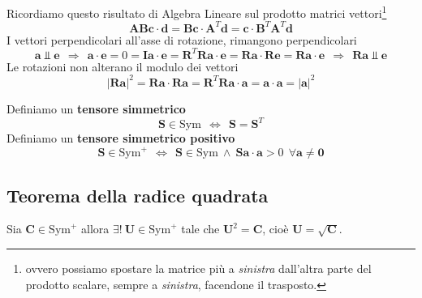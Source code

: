 \documentclass[10pt,a4paper,twoside]{book}
\begin{document}
\begin{oss}
Ricordiamo questo risultato di Algebra Lineare sul prodotto matrici vettori\footnote{ovvero possiamo spostare la matrice più a \textit{sinistra} dall'altra parte del prodotto scalare, sempre a \textit{sinistra}, facendone il trasposto.}
\begin{equation*}
\mathbf{ABc} \cdotp \mathbf{d} =\mathbf{Bc} \cdotp \mathbf{A}^{T}\mathbf{d} =\mathbf{c} \cdotp \mathbf{B}^{T}\mathbf{A}^{T}\mathbf{d}
\end{equation*}
I vettori perpendicolari all'asse di rotazione, rimangono perpendicolari
\begin{equation*}
\mathbf{a} \Bot \mathbf{e} \ \ \Rightarrow \ \ \mathbf{a\cdotp e} =0=\mathbf{Ia} \cdotp \mathbf{e} =\mathbf{R}^{T}\mathbf{Ra} \cdotp \mathbf{e} =\mathbf{Ra} \cdotp \mathbf{Re} =\mathbf{Ra} \cdotp \mathbf{e} \ \ \Rightarrow \ \ \mathbf{Ra} \Bot \mathbf{e}
\end{equation*}
Le rotazioni non alterano il modulo dei vettori
\begin{equation*}
| \mathbf{Ra}| ^{2} =\mathbf{Ra} \cdotp \mathbf{Ra} =\mathbf{R}^{T}\mathbf{Ra} \cdotp \mathbf{a} =\mathbf{a} \cdotp \mathbf{a} =| \mathbf{a}| ^{2}
\end{equation*}
\end{oss}
Definiamo un \textbf{tensore simmetrico}
\begin{equation*}
\boxed{\mathbf{S} \in \mathrm{Sym}} \ \ \Leftrightarrow \ \ \boxed{\mathbf{S} =\mathbf{S}^{T}}
\end{equation*}
Definiamo un \textbf{tensore simmetrico positivo}
\begin{equation*}
\boxed{\mathbf{S} \in \mathrm{Sym}^{+}} \ \ \Leftrightarrow \ \ \boxed{\mathbf{S} \in \mathrm{Sym} \ \land \ \mathbf{Sa} \cdotp \mathbf{a}  >0\ \ \forall \mathbf{a} \neq \mathbf{0}}
\end{equation*}
\subsection{Teorema della radice quadrata}

Sia $\mathbf{C} \in \mathrm{Sym}^{+}$ allora $\exists !\ \mathbf{U} \in \mathrm{Sym}^{+}$ tale che $\mathbf{U}^{2} =\mathbf{C}$, cioè $\mathbf{U} =\sqrt{\mathbf{C}}$.
\end{document}
